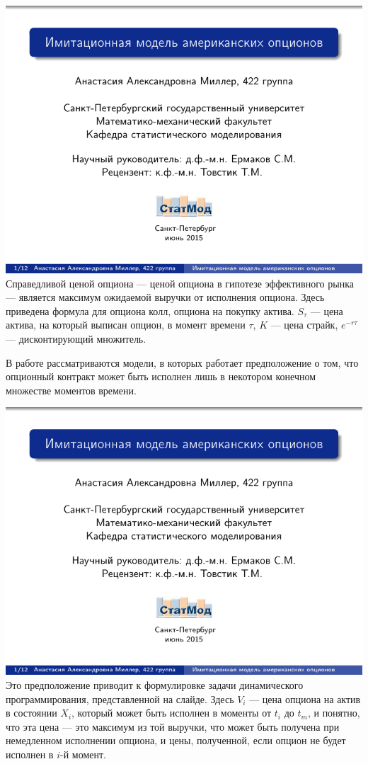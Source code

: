 \documentclass[14pt,a4paper]{extarticle}
\begin{document}
\includegraphics[page=\theslidenumber, width=\textwidth]{8th-semester-presentation.pdf}
Справедливой ценой опциона --- ценой опциона в гипотезе эффективного рынка --- является максимум ожидаемой выручки от исполнения опциона. Здесь приведена формула для опциона колл, опциона на покупку актива. $S_\tau$ --- цена актива, на который выписан опцион, в момент времени $\tau$, $K$ --- цена страйк, $e^{-r\tau}$ --- дисконтирующий множитель.

В работе рассматриваются модели, в которых работает предположение о том, что опционный контракт может быть исполнен лишь в некотором конечном множестве моментов времени. 

\includegraphics[page=\theslidenumber, width=\textwidth]{8th-semester-presentation.pdf}
Это предположение приводит к формулировке задачи динамического программирования, представленной на слайде. Здесь $V_i$ --- цена опциона на актив в состоянии $X_i$, который может быть исполнен в моменты от $t_i$ до $t_m$, и понятно, что эта цена --- это максимум из той выручки, что может быть получена при немедленном исполнении опциона, и цены, полученной, если опцион не будет исполнен в $i$-й момент.
\end{document}
